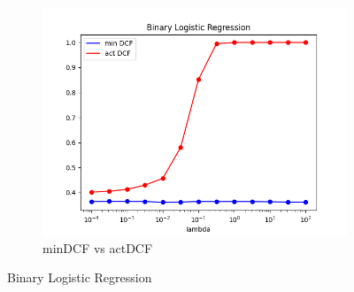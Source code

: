 \begin{figure}[h!]
\begin{subfigure}[b]{0.3\linewidth}
        \label{fig:BLRactDCF}
    \end{subfigure}
    \begin{subfigure}[b]{0.3\linewidth}
        \includegraphics[width=\linewidth]{Lab/08. Lab 08/Images/03. BLR - min And actDCF}
        \caption{minDCF vs actDCF}
        \label{fig:minAndactDCF}
    \end{subfigure}
    \caption{Binary Logistic Regression}
    \label{fig:BLR}
\end{figure}